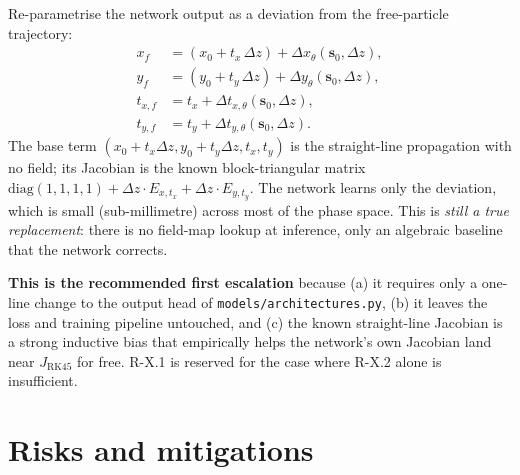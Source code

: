 \documentclass[11pt,a4paper]{article}
\newcommand{\dz}{\ensuremath{\Delta z}}
\newcommand{\state}{\ensuremath{\mathbf{s}}}
\newcommand{\code}[1]{\texttt{#1}}
\begin{document}
Re-parametrise the network output as a deviation from the free-particle
trajectory:
\begin{align}
x_f &= (x_0 + t_x \, \dz) + \Delta x_\theta(\state_0, \dz), \\
y_f &= (y_0 + t_y \, \dz) + \Delta y_\theta(\state_0, \dz), \\
t_{x,f} &= t_x + \Delta t_{x,\theta}(\state_0, \dz), \\
t_{y,f} &= t_y + \Delta t_{y,\theta}(\state_0, \dz).
\end{align}
The base term $(x_0 + t_x \dz, y_0 + t_y \dz, t_x, t_y)$ is the
straight-line propagation with no field; its Jacobian is the known
block-triangular matrix
\(\mathrm{diag}(1,1,1,1) + \dz \cdot E_{x,t_x} + \dz \cdot E_{y,t_y}\).
The network learns only the deviation, which is small (sub-millimetre)
across most of the phase space. This is \emph{still a true replacement}:
there is no field-map lookup at inference, only an algebraic baseline
that the network corrects.

\textbf{This is the recommended first escalation} because (a) it requires
only a one-line change to the output head of \code{models/architectures.py},
(b) it leaves the loss and training pipeline untouched, and (c) the
known straight-line Jacobian is a strong inductive bias that empirically
helps the network's own Jacobian land near $J_\text{RK45}$ for free.
R-X.1 is reserved for the case where R-X.2 alone is insufficient.

\section{Risks and mitigations}
\label{sec:risks}
\end{document}
